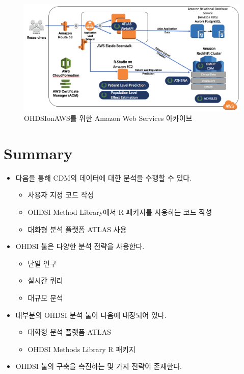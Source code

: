 \documentclass[11pt]{book}
\providecommand{\tightlist}{%
  \setlength{\itemsep}{0pt}\setlength{\parskip}{0pt}}
\theoremstyle{definition}
\theoremstyle{definition}
\theoremstyle{definition}
\theoremstyle{remark}
\let\BeginKnitrBlock\begin \let\EndKnitrBlock\end
\begin{document}
\begin{figure}

{\centering \includegraphics[width=1\linewidth]{images/OhdsiAnalyticsTools/OHDSIonAWSDiagram} 

}

\caption{OHDSIonAWS를 위한 Amazon Web Services 아카이브}\label{fig:ohdsionawsDiagram}
\end{figure}

\section{Summary}\label{summary-3}

\BeginKnitrBlock{rmdsummary}
\begin{itemize}
\tightlist
\item
  다음을 통해 CDM의 데이터에 대한 분석을 수행할 수 있다.

  \begin{itemize}
  \tightlist
  \item
    사용자 지정 코드 작성
  \item
    OHDSI Method Library에서 R 패키지를 사용하는 코드 작성
  \item
    대화형 분석 플랫폼 ATLAS 사용
  \end{itemize}
\item
  OHDSI 툴은 다양한 분석 전략을 사용한다.

  \begin{itemize}
  \tightlist
  \item
    단일 연구
  \item
    실시간 쿼리
  \item
    대규모 분석
  \end{itemize}
\item
  대부분의 OHDSI 분석 툴이 다음에 내장되어 있다.

  \begin{itemize}
  \tightlist
  \item
    대화형 분석 플랫폼 ATLAS
  \item
    OHDSI Methods Library R 패키지
  \end{itemize}
\item
  OHDSI 툴의 구축을 촉진하는 몇 가지 전략이 존재한다.
\end{itemize}
\EndKnitrBlock{rmdsummary}
\end{document}
